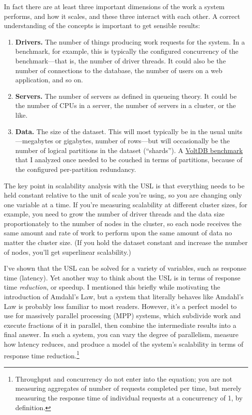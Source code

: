 \documentclass{vivid_layout}
\begin{document}
In fact there are at least three important dimensions of the work a system
performs, and how it scales, and these three interact with each other. A correct
understanding of the concepts is important to get sensible results:

\begin{enumerate}
\item {\bfseries Drivers.} The number of things producing work requests for the
system. In a benchmark, for example, this is typically the configured
concurrency of the benchmark---that is, the number of driver threads. It could
also be the number of connections to the database, the number of users on a web
application, and so on.
\item {\bfseries Servers.} The number of servers as defined in queueing theory. It could be the
number of CPUs in a server, the number of servers in a cluster, or the like.
\item {\bfseries Data.} The size of the dataset. This will most typically be in the usual
units---megabytes or gigabytes, number of rows---but will occasionally be the
number of logical partitions in the dataset (``shards''). A
\href{https://www.percona.com/blog/2011/02/28/is-voltdb-really-as-scalable-as-they-claim/}{VoltDB
benchmark} that I analyzed once needed to be couched in terms of partitions,
because of the configured per-partition redundancy.
\end{enumerate}

The key point in scalability analysis with the USL is that everything needs to be held
constant relative to the unit of scale you're using, so you are changing only
one variable at a time. If you're measuring scalability at different cluster
sizes, for example, you need to grow the number of driver threads and the data
size proportionately to the number of nodes in the cluster, so each node
receives the same amount and rate of work to perform upon the same amount of
data no matter the cluster size. (If you hold the dataset constant and increase
the number of nodes, you'll get superlinear scalability.)

I've shown that the USL can be solved for a variety of variables, such as
response time (latency). Yet another way to think about the USL is in terms of
response time {\itshape reduction}, or speedup. I mentioned this briefly while
motivating the introduction of Amdahl's Law, but a system that literally behaves
like Amdahl's Law is probably less familiar to most readers.  However, it's a
perfect model to use for massively parallel processing (MPP) systems, which
subdivide work and execute fractions of it in parallel, then combine the
intermediate results into a final answer. In such a system, you can vary the
degree of parallelism, measure how latency reduces, and produce a model of the
system's scalability in terms of response time reduction.\footnote{Throughput
and concurrency do not enter into the equation; you are not measuring aggregates
of number of requests completed per time, but merely measuring the response time
of individual requests at a concurrency of 1, by definition.}
\end{document}
